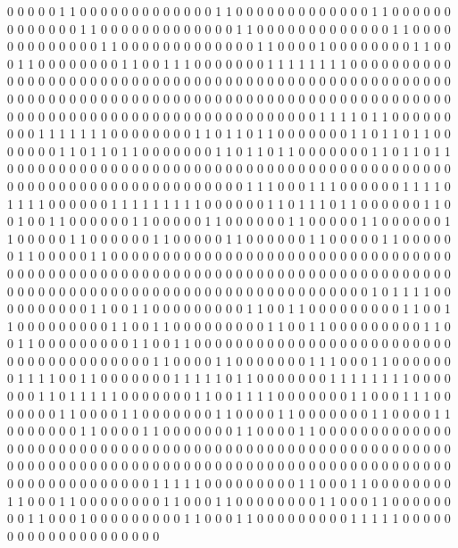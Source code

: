 0 0 0 0 0 1 1 0 0 0 0 0 0 0 0
0 0 0 0 0 1 1 0 0 0 0 0 0 0 0
0 0 0 0 0 1 1 0 0 0 0 0 0 0 0
0 0 0 0 0 1 1 0 0 0 0 0 0 0 0
0 0 0 0 0 1 1 0 0 0 0 0 0 0 0
0 0 0 0 0 1 1 0 0 0 0 0 0 0 0
0 0 0 0 0 1 1 0 0 0 0 0 0 0 0
0 0 0 0 0 1 1 0 0 0 0 1 0 0 0
0 0 0 0 0 1 1 0 0 0 1 1 0 0 0
0 0 0 0 0 1 1 0 0 1 1 1 0 0 0
0 0 0 0 1 1 1 1 1 1 1 1 0 0 0
0 0 0 0 0 0 0 0 0 0 0 0 0 0 0
0 0 0 0 0 0 0 0 0 0 0 0 0 0 0
0 0 0 0 0 0 0 0 0 0 0 0 0 0 0
0 0 0 0 0 0 0 0 0 0 0 0 0 0 0
0 0 0 0 0 0 0 0 0 0 0 0 0 0 0
0 0 0 0 0 0 0 0 0 0 0 0 0 0 0
0 0 0 0 0 0 0 0 0 0 0 0 0 0 0
0 0 0 0 0 0 0 0 0 0 0 0 0 0 0
0 0 0 1 1 1 1 0 1 1 0 0 0 0 0
0 0 0 0 1 1 1 1 1 1 1 0 0 0 0
0 0 0 0 1 1 0 1 1 0 1 1 0 0 0
0 0 0 0 1 1 0 1 1 0 1 1 0 0 0
0 0 0 0 1 1 0 1 1 0 1 1 0 0 0
0 0 0 0 1 1 0 1 1 0 1 1 0 0 0
0 0 0 0 1 1 0 1 1 0 1 1 0 0 0
0 0 0 0 0 0 0 0 0 0 0 0 0 0 0
0 0 0 0 0 0 0 0 0 0 0 0 0 0 0
0 0 0 0 0 0 0 0 0 0 0 0 0 0 0
0 0 0 0 0 0 0 0 0 0 0 0 0 0 0
0 0 0 1 1 1 0 0 0 1 1 1 0 0 0
0 0 0 1 1 1 1 0 1 1 1 1 0 0 0
0 0 0 1 1 1 1 1 1 1 1 1 0 0 0
0 0 0 1 1 0 1 1 1 0 1 1 0 0 0
0 0 0 1 1 0 0 1 0 0 1 1 0 0 0
0 0 0 1 1 0 0 0 0 0 1 1 0 0 0
0 0 0 1 1 0 0 0 0 0 1 1 0 0 0
0 0 0 1 1 0 0 0 0 0 1 1 0 0 0
0 0 0 1 1 0 0 0 0 0 1 1 0 0 0
0 0 0 1 1 0 0 0 0 0 1 1 0 0 0
0 0 0 1 1 0 0 0 0 0 1 1 0 0 0
0 0 0 0 0 0 0 0 0 0 0 0 0 0 0
0 0 0 0 0 0 0 0 0 0 0 0 0 0 0
0 0 0 0 0 0 0 0 0 0 0 0 0 0 0
0 0 0 0 0 0 0 0 0 0 0 0 0 0 0
0 0 0 0 0 0 0 0 0 0 0 0 0 0 0
0 0 0 0 0 0 0 0 0 0 0 0 0 0 0
0 0 0 0 0 0 0 0 0 0 0 0 0 0 0
0 0 0 1 0 1 1 1 1 0 0 0 0 0 0
0 0 0 0 1 1 0 0 1 1 0 0 0 0 0
0 0 0 0 1 1 0 0 1 1 0 0 0 0 0
0 0 0 0 1 1 0 0 1 1 0 0 0 0 0
0 0 0 0 1 1 0 0 1 1 0 0 0 0 0
0 0 0 0 1 1 0 0 1 1 0 0 0 0 0
0 0 0 0 1 1 0 0 1 1 0 0 0 0 0
0 0 0 0 1 1 0 0 1 1 0 0 0 0 0
0 0 0 0 0 0 0 0 0 0 0 0 0 0 0
0 0 0 0 0 0 0 0 0 0 0 0 0 0 0
0 0 0 0 1 1 0 0 0 0 1 1 0 0 0
0 0 0 0 1 1 1 0 0 0 1 1 0 0 0
0 0 0 0 1 1 1 1 0 0 1 1 0 0 0
0 0 0 0 1 1 1 1 1 0 1 1 0 0 0
0 0 0 0 1 1 1 1 1 1 1 1 0 0 0
0 0 0 0 1 1 0 1 1 1 1 1 0 0 0
0 0 0 0 1 1 0 0 1 1 1 1 0 0 0
0 0 0 0 1 1 0 0 0 1 1 1 0 0 0
0 0 0 0 1 1 0 0 0 0 1 1 0 0 0
0 0 0 0 1 1 0 0 0 0 1 1 0 0 0
0 0 0 0 1 1 0 0 0 0 1 1 0 0 0
0 0 0 0 1 1 0 0 0 0 1 1 0 0 0
0 0 0 0 1 1 0 0 0 0 1 1 0 0 0
0 0 0 0 0 0 0 0 0 0 0 0 0 0 0
0 0 0 0 0 0 0 0 0 0 0 0 0 0 0
0 0 0 0 0 0 0 0 0 0 0 0 0 0 0
0 0 0 0 0 0 0 0 0 0 0 0 0 0 0
0 0 0 0 0 0 0 0 0 0 0 0 0 0 0
0 0 0 0 0 0 0 0 0 0 0 0 0 0 0
0 0 0 0 0 0 0 0 0 0 0 0 0 0 0
0 0 0 0 0 1 1 1 1 1 0 0 0 0 0
0 0 0 0 1 1 0 0 0 1 1 0 0 0 0
0 0 0 0 1 1 0 0 0 1 1 0 0 0 0
0 0 0 0 1 1 0 0 0 1 1 0 0 0 0
0 0 0 0 1 1 0 0 0 1 1 0 0 0 0
0 0 0 0 1 1 0 0 0 1 0 0 0 0 0
0 0 0 0 1 1 0 0 0 1 1 0 0 0 0
0 0 0 0 0 1 1 1 1 1 0 0 0 0 0
0 0 0 0 0 0 0 0 0 0 0 0 0 0 0
